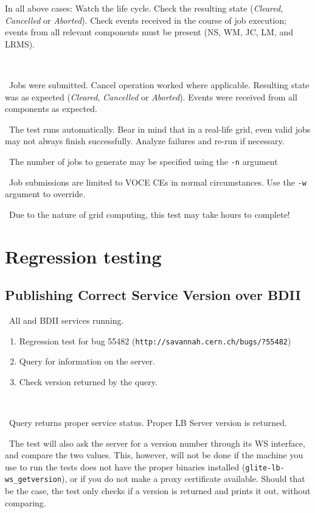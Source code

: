 In all above cases: Watch the life cycle. Check the resulting state (\emph{Cleared}, \emph{Cancelled} or \emph{Aborted}). Check events received in the course of job execution; events from all relevant components must be present (NS, WM, JC, LM, and LRMS). 

\how\ 

\result\ Jobs were submitted. Cancel operation worked where applicable. Resulting state was as expected (\emph{Cleared}, \emph{Cancelled} or \emph{Aborted}). Events were received from all components as expected.

\note\ The test runs automatically. Bear in mind that in a real-life grid, even valid jobs may not always finish successfully. Analyze failures and re-run if necessary.

\note\ The number of jobs to generate may be specified using the \texttt{-n} argument

\note\ Job submissions are limited to VOCE CEs in normal circumstances. Use the \texttt{-w} argument to override. 

\note\ Due to the nature of grid computing, this test may take hours to complete!  



\section{Regression testing}

\subsection{Publishing Correct Service Version over BDII}
\req\ All \LB and BDII services running.

\what
\begin{enumerate}
\item Regression test for bug 55482 (\texttt{http://savannah.cern.ch/bugs/?55482})
\item Query for information on the server.
\item Check version returned by the query.
\end{enumerate}

\how\ 

\result\ Query returns proper service status. Proper LB Server version is returned.

\note\ The test will also ask the \LB server for a version number through its WS interface, and compare the two values. This, however, will not be done if the machine you use to run the tests does not have the proper binaries installed (\texttt{glite-lb-ws\_getversion}), or if you do not make a proxy certificate available. Should that be the case, the test only checks if a version is returned and prints it out, without comparing.

